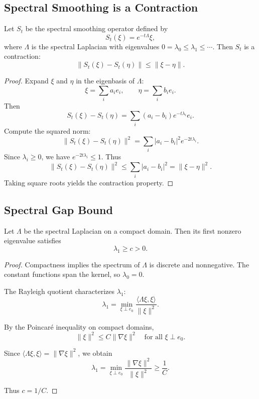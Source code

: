 \subsection{Spectral Smoothing is a Contraction}

\begin{lemma}
Let $S_t$ be the spectral smoothing operator defined by
\[
S_t(\xi) = e^{-t\Lambda}\xi,
\]
where $\Lambda$ is the spectral Laplacian with eigenvalues
$0 = \lambda_0 \le \lambda_1 \le \cdots$.
Then $S_t$ is a contraction:
\[
\| S_t(\xi) - S_t(\eta) \|
\le
\| \xi - \eta \|.
\]
\end{lemma}

\begin{proof}
Expand $\xi$ and $\eta$ in the eigenbasis of $\Lambda$:
\[
\xi = \sum_i a_i e_i,
\qquad
\eta = \sum_i b_i e_i.
\]
Then
\[
S_t(\xi) - S_t(\eta)
= \sum_i (a_i - b_i) e^{-t\lambda_i} e_i.
\]
Compute the squared norm:
\[
\| S_t(\xi) - S_t(\eta) \|^2
= \sum_i |a_i - b_i|^2 e^{-2t\lambda_i}.
\]
Since $\lambda_i \ge 0$, we have $e^{-2t\lambda_i} \le 1$. Thus
\[
\| S_t(\xi) - S_t(\eta) \|^2
\le \sum_i |a_i - b_i|^2
= \| \xi - \eta \|^2.
\]
Taking square roots yields the contraction property.
\end{proof}

\subsection{Spectral Gap Bound}

\begin{lemma}
Let $\Lambda$ be the spectral Laplacian on a compact domain.  
Then its first nonzero eigenvalue satisfies
\[
\lambda_1 \ge c > 0.
\]
\end{lemma}

\begin{proof}
Compactness implies the spectrum of $\Lambda$ is discrete and nonnegative.
The constant functions span the kernel, so $\lambda_0 = 0$.

The Rayleigh quotient characterizes $\lambda_1$:
\[
\lambda_1
= \min_{\xi \perp e_0}
\frac{\langle \Lambda \xi, \xi \rangle}{\|\xi\|^2}.
\]

By the Poincaré inequality on compact domains,
\[
\|\xi\|^2 \le C \|\nabla \xi\|^2
\quad\text{for all }\xi \perp e_0.
\]

Since $\langle \Lambda \xi, \xi \rangle = \|\nabla \xi\|^2$, we obtain
\[
\lambda_1
= \min_{\xi \perp e_0}
\frac{\|\nabla \xi\|^2}{\|\xi\|^2}
\ge \frac{1}{C}.
\]

Thus $c = 1/C$.
\end{proof}

